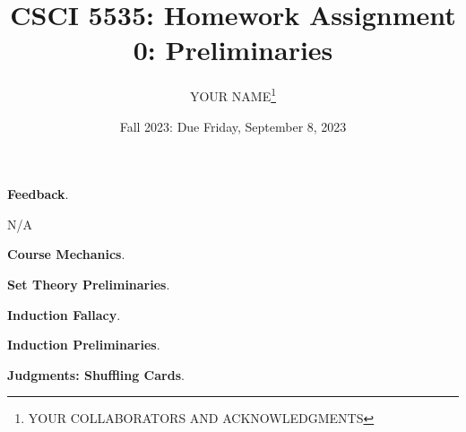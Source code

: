 \documentclass[11pt]{exam}
\title{CSCI 5535: Homework Assignment 0: Preliminaries}
\date{Fall 2023: Due Friday, September 8, 2023}
\author{YOUR NAME\thanks{YOUR COLLABORATORS AND ACKNOWLEDGMENTS}}
\begin{document}
\maketitle

\begin{questions}
\question \textbf{Feedback}. 

N/A

\question \textbf{Course Mechanics}.

\question \textbf{Set Theory Preliminaries}. 

\question \textbf{Induction Fallacy}.

\question \textbf{Induction Preliminaries}.

\question \textbf{Judgments: Shuffling Cards}.

\end{questions}
\end{document}
